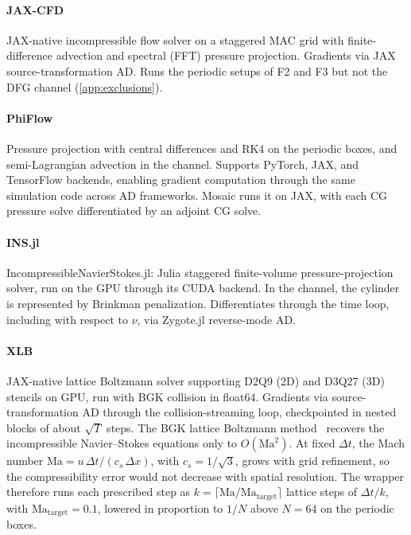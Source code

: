 \paragraph{JAX-CFD~\cite{kochkov2021machine}}
JAX-native incompressible flow solver on a staggered MAC grid with
finite-difference advection and spectral (FFT) pressure projection.
Gradients via JAX source-transformation AD.
Runs the periodic setups of F2 and F3 but not the DFG channel
(\cref{app:exclusions}).

\paragraph{PhiFlow~\cite{holl2024phiflow}}
Pressure projection with central differences and RK4 on the periodic boxes,
and semi-Lagrangian advection in the channel.
Supports PyTorch, JAX, and TensorFlow backends, enabling gradient
computation through the same simulation code across AD frameworks.
Mosaic runs it on JAX, with each CG pressure solve differentiated by an
adjoint CG solve.

\paragraph{INS.jl~\cite{agdestein2024ins}}
IncompressibleNavierStokes.jl: Julia staggered finite-volume pressure-projection
solver, run on the GPU through its CUDA backend. In the channel, the cylinder is
represented by Brinkman penalization. Differentiates through the time loop,
including with respect to $\nu$, via Zygote.jl reverse-mode AD.

\paragraph{XLB~\cite{ataei2024xlb}}
JAX-native lattice Boltzmann solver supporting D2Q9 (2D) and D3Q27 (3D) stencils on
GPU, run with BGK collision in float64. Gradients via source-transformation AD
through the collision-streaming loop, checkpointed in nested blocks of about
$\sqrt{T}$ steps.
The BGK lattice Boltzmann method~\cite{qian1992lattice} recovers the
incompressible Navier--Stokes equations only to $O(\mathrm{Ma}^2)$. At fixed
$\Delta t$, the Mach number $\mathrm{Ma} = u\,\Delta t / (c_s\,\Delta x)$, with
$c_s=1/\sqrt{3}$, grows with grid refinement, so the compressibility error would
not decrease with spatial resolution. The wrapper therefore runs each prescribed
step as $k=\lceil \mathrm{Ma}/\mathrm{Ma}_\text{target}\rceil$ lattice steps of
$\Delta t/k$, with $\mathrm{Ma}_\text{target}=0.1$, lowered in proportion to $1/N$
above $N=64$ on the periodic boxes.

